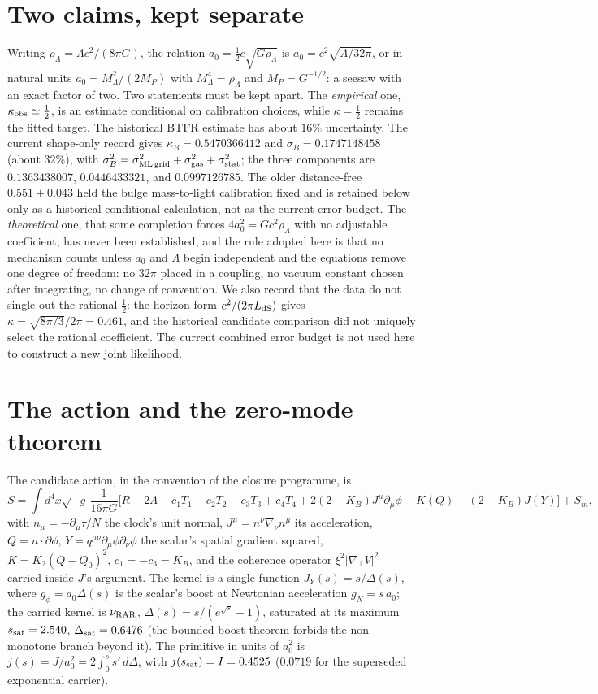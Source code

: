 \documentclass[11pt,letterpaper]{article}
\begin{document}
\section{Two claims, kept separate}
Writing $\rho_\Lambda=\Lambda c^2/(8\pi G)$, the relation $a_0=\tfrac12c\sqrt{G\rho_\Lambda}$ is $a_0=c^2\sqrt{\Lambda/32\pi}$, or in natural units $a_0=M_\Lambda^2/(2M_P)$ with $M_\Lambda^4=\rho_\Lambda$ and $M_P=G^{-1/2}$: a seesaw with an exact factor of two. Two statements must be kept apart. The \emph{empirical} one, $\kappa_{\rm obs}\simeq\tfrac12$, is an estimate conditional on calibration choices, while $\kappa=\tfrac12$ remains the fitted target. The historical BTFR estimate has about $16\%$ uncertainty. The current shape-only record gives $\kappa_B=0.5470366412$ and $\sigma_B=0.1747148458$ (about $32\%$), with $\sigma_B^2=\sigma_{\rm ML\,grid}^2+\sigma_{\rm gas}^2+\sigma_{\rm stat}^2$; the three components are $0.1363438007$, $0.0446433321$, and $0.0997126785$. The older distance-free $0.551\pm0.043$ held the bulge mass-to-light calibration fixed and is retained below only as a historical conditional calculation, not as the current error budget. The \emph{theoretical} one, that some completion forces $4a_0^2=Gc^2\rho_\Lambda$ with no adjustable coefficient, has never been established, and the rule adopted here is that no mechanism counts unless $a_0$ and $\Lambda$ begin independent and the equations remove one degree of freedom: no $32\pi$ placed in a coupling, no vacuum constant chosen after integrating, no change of convention. We also record that the data do not single out the rational $\tfrac12$: the horizon form $c^2/(2\pi L_{\rm dS})$ gives $\kappa=\sqrt{8\pi/3}/2\pi=0.461$, and the historical candidate comparison did not uniquely select the rational coefficient. The current combined error budget is not used here to construct a new joint likelihood.

\section{The action and the zero-mode theorem}
The candidate action, in the convention of the closure programme, is
\begin{equation}
S=\!\int\! d^4x\sqrt{-g}\,\frac{1}{16\pi G}\Big[R-2\Lambda-c_1T_1-c_2T_2-c_3T_3+c_4T_4+2(2-K_B)J^\mu\partial_\mu\phi-K(Q)-(2-K_B)J(Y)\Big]+S_m,
\end{equation}
with $n_\mu=-\partial_\mu\tau/N$ the clock's unit normal, $J^\mu=n^\nu\nabla_\nu n^\mu$ its acceleration, $Q=n\cdot\partial\phi$, $Y=q^{\mu\nu}\partial_\mu\phi\partial_\nu\phi$ the scalar's spatial gradient squared, $K=K_2(Q-Q_0)^2$, $c_1=-c_3=K_B$, and the coherence operator $\xi^2|\nabla_\perp V|^2$ carried inside $J$'s argument. The kernel is a single function $J_Y(s)=s/\Delta(s)$, where $g_\phi=a_0\Delta(s)$ is the scalar's boost at Newtonian acceleration $g_N=s\,a_0$; the carried kernel is $\nu_{\rm RAR}$, $\Delta(s)=s/(e^{\sqrt s}-1)$, saturated at its maximum $s_{\rm sat}=2.540$, $\Delta_{\rm sat}=0.6476$ (the bounded-boost theorem forbids the non-monotone branch beyond it). The primitive in units of $a_0^2$ is $j(s)=J/a_0^2=2\int_0^s s'\,d\Delta$, with $j(s_{\rm sat})=I=0.4525$ ($0.0719$ for the superseded exponential carrier).
\end{document}
